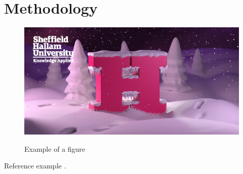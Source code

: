 \chapter{Methodology}

\begin{figure}[!htb]
    \caption{Example of a figure}
    \centering 
    \includegraphics[scale=0.5]{images/img.png}
    \label{figure:img}
\end{figure}


Reference example \cite{Abreu:2010}.